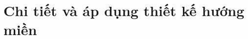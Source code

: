 \documentclass{article} %
\begin{document}




% 


\section{Chi tiết và áp dụng thiết kế hướng miền}




% 


% 


% 

\end{document}
